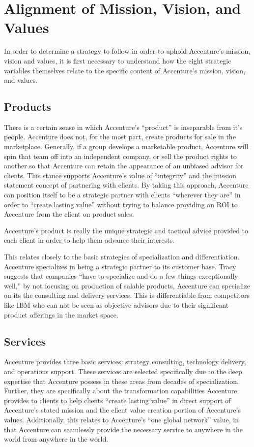 \section{Alignment of Mission, Vision, and Values}

In order to determine a strategy to follow in order to uphold Accenture's mission, vision and values, it is first necessary to understand how the eight strategic variables themselves relate to the specific content of Accenture's mission, vision, and values.

\subsection{Products}

There is a certain sense in which Accenture's ``product'' is inseparable from it's people. Accenture does not, for the most part, create products for sale in the marketplace. Generally, if a group develops a marketable product, Accenture will spin that team off into an independent company, or sell the product rights to another so that Accenture can retain the appearance of an unbiased advisor for clients. This stance supports Accenture's value of ``integrity'' and the mission statement concept of partnering with clients. By taking this approach, Accenture can position itself to be a strategic partner with clients ``wherever they are'' in order to ``create lasting value'' without trying to balance providing an ROI to Accenture from the client on product sales.

Accenture's product is really the unique strategic and tactical advice provided to each client in order to help them advance their interests.

This relates closely to the basic strategies of specialization and differentiation. Accenture specializes in being a strategic partner to its customer base. Tracy suggests that companies ``have to specialize and do a few things exceptionally well,'' by not focusing on production of salable products, Accenture can specialize on its the consulting and delivery services. This is differentiable from competitors like IBM who can not be seen as objective advisors due to their significant product offerings in the market space.

\subsection{Services}

Accenture provides three basic services: strategy consulting, technology delivery, and operations support. These services are selected specifically due to the deep expertise that Accenture possess in these areas from decades of specialization. Further, they are specifically about the transformation capabilities Accenture provides to clients to help clients ``create lasting value'' in direct support of Accenture's stated mission and the client value creation portion of Accenture's values. Additionally, this relates to Accenture's ``one global network'' value, in that Accenture can seamlessly provide the necessary service to anywhere in the world from anywhere in the world.

